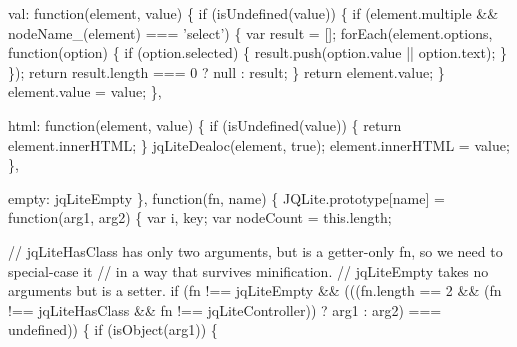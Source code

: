 \begin{DoxyCodeInclude}
{  val: \textcolor{keyword}{function}(element, value) \{
    \textcolor{keywordflow}{if} (isUndefined(value)) \{
      \textcolor{keywordflow}{if} (element.multiple && nodeName\_(element) === \textcolor{stringliteral}{'select'}) \{
        var result = [];
        forEach(element.options, \textcolor{keyword}{function}(option) \{
          if (option.selected) \{
            result.push(option.value || option.text);
          \}
        \});
        \textcolor{keywordflow}{return} result.length === 0 ? null : result;
      \}
      \textcolor{keywordflow}{return} element.value;
    \}
    element.value = value;
  \},

  html: \textcolor{keyword}{function}(element, value) \{
    \textcolor{keywordflow}{if} (isUndefined(value)) \{
      \textcolor{keywordflow}{return} element.innerHTML;
    \}
    jqLiteDealoc(element, \textcolor{keyword}{true});
    element.innerHTML = value;
  \},

  empty: jqLiteEmpty
\}, \textcolor{keyword}{function}(fn, name) \{
  JQLite.prototype[name] = \textcolor{keyword}{function}(arg1, arg2) \{
    var i, key;
    var nodeCount = this.length;

    \textcolor{comment}{// jqLiteHasClass has only two arguments, but is a getter-only fn, so we need to special-case it}
    \textcolor{comment}{// in a way that survives minification.}
    \textcolor{comment}{// jqLiteEmpty takes no arguments but is a setter.}
    \textcolor{keywordflow}{if} (fn !== jqLiteEmpty &&
        (((fn.length == 2 && (fn !== jqLiteHasClass && fn !== jqLiteController)) ? arg1 : arg2) === 
      undefined)) \{
      \textcolor{keywordflow}{if} (isObject(arg1)) \{

}
\end{DoxyCodeInclude}
